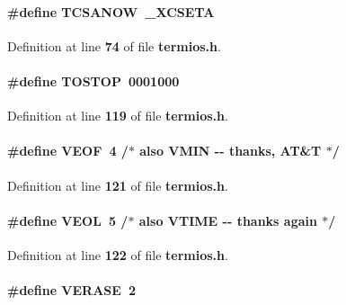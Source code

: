 \paragraph[{T\+C\+S\+A\+N\+OW}]{\setlength{\rightskip}{0pt plus 5cm}\#define T\+C\+S\+A\+N\+OW~{\bf \+\_\+\+X\+C\+S\+E\+TA}}\label{termios_8h_a8147c7f8db262c162c187575e17eeb63}


Definition at line {\bf 74} of file {\bf termios.\+h}.

\paragraph[{T\+O\+S\+T\+OP}]{\setlength{\rightskip}{0pt plus 5cm}\#define T\+O\+S\+T\+OP~0001000}\label{termios_8h_a79c826e2e8762135eda0b51352241bc6}


Definition at line {\bf 119} of file {\bf termios.\+h}.

\paragraph[{V\+E\+OF}]{\setlength{\rightskip}{0pt plus 5cm}\#define V\+E\+OF~4 /$\ast$ also {\bf V\+M\+IN} -\/-\/ thanks, AT\&T $\ast$/}\label{termios_8h_a2913fdfccc72db70821a2100bfc8217a}


Definition at line {\bf 121} of file {\bf termios.\+h}.

\paragraph[{V\+E\+OL}]{\setlength{\rightskip}{0pt plus 5cm}\#define V\+E\+OL~5 /$\ast$ also {\bf V\+T\+I\+ME} -\/-\/ thanks again $\ast$/}\label{termios_8h_a659dbdf07b27a95c6ca57fb14a9e15ad}


Definition at line {\bf 122} of file {\bf termios.\+h}.

\paragraph[{V\+E\+R\+A\+SE}]{\setlength{\rightskip}{0pt plus 5cm}\#define V\+E\+R\+A\+SE~2}\label{termios_8h_a6e11c405d7ddff22c2318c8623c3affa}


